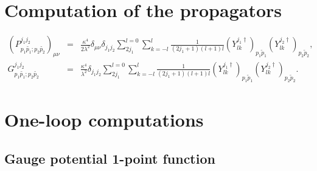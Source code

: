 \documentclass[a4paper,11pt]{article} %
\numberwithin{equation}{section} %
\numberwithin{figure}{section} %
\theoremstyle{plain} %
\theoremstyle{definition} %
\theoremstyle{remark} %
\begin{document}
\section{Computation of the propagators}

\begin{eqnarray*}
 (P^{j_1 j_2 }_{p_1 \tilde{p_1} ; p_2 \tilde{p_2} })_{\mu \nu}     &=& 
                \frac{\kappa^4}{2 \lambda^2} \delta_{\mu \nu} \delta_{j_1 j_2}  \sum_{2 j_1}^{l=0} \sum_{k=-l}^{l} \frac{1}{(2j_1 + 1)(l+1)l} (Y^{j_1 \dagger}_{l k})_{p_1 \tilde{p}_1 } (Y^{j_2 \dagger}_{l k})_{p_2 \tilde{p}_2 } ,\\
 G^{j_1 j_2 }_{p_1 \tilde{p_1} ; p_2 \tilde{p_2} }                 &=& 
                \frac{\kappa^4}{\lambda^2} \delta_{j_1 j_2} \sum_{2 j_1}^{l=0} \sum_{k=-l}^{l} \frac{1}{(2 j_1 + 1)(l+1)l} (Y^{j_1 \dagger}_{l k})_{p_1 \tilde{p}_1 } (Y^{j_2 \dagger}_{l k})_{p_2 \tilde{p}_2 }.
\end{eqnarray*}

\section{One-loop computations}

\subsection*{Gauge potential 1-point function}
\end{document}
